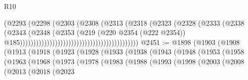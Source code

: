 \begin{lexlean}{R10}
\begin{coremodule}
                                                                (@2293
                                                                  (@2298
                                                                    (@2303
                                                                      (@2308
                                                                        (@2313
                                                                          (@2318
                                                                            (@2323
                                                                              (@2328
                                                                                (@2333
                                                                                  (@2338
                                                                                    (@2343
                                                                                      (@2348
                                                                                        (@2353
                                                                                          (@219
                                                                                            (@220
                                                                                              @2354
                                                                                              (@222
                                                                                                @2354))
                                                                                            @185))))))))))))))))))))))))))))))))))))))))))))
@2451 := @1898
    (@1903
      (@1908
        (@1913
          (@1918
            (@1923
              (@1928
                (@1933
                  (@1938
                    (@1943
                      (@1948
                        (@1953
                          (@1958
                            (@1963
                              (@1968
                                (@1973
                                  (@1978
                                    (@1983
                                      (@1988
                                        (@1993
                                          (@1998
                                            (@2003
                                              (@2008
                                                (@2013
                                                  (@2018
                                                    (@2023

\end{coremodule}
\end{lexlean}
